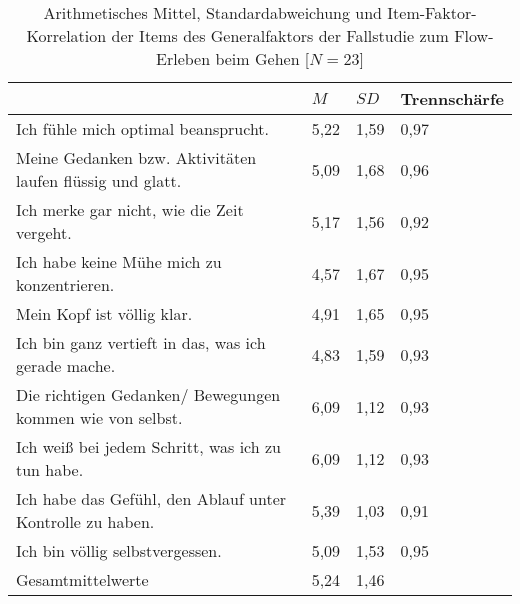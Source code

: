 \pagebreak

\begin{table}[ht]
\centering
	\caption[Item-Faktor-Korrelation der Items des Generalfaktors (Fallstudie: Gehen)]{Arithmetisches Mittel, Standardabweichung und Item-Faktor-Korrelation der Items des Generalfaktors der Fallstudie zum Flow-Erleben beim Gehen [$N = 23$]}
	\label{tab:generalfaktor_fallstudie_gehen}
	\begin{tabularx}{\textwidth}{p{} p{} p{} p{}}
\toprule
& $M$ & $SD$ & Trennschärfe \\
\midrule
Ich fühle mich optimal beansprucht. & 5,22 & 1,59 & 0,97 \\ 
  Meine Gedanken bzw. Aktivitäten laufen flüssig und glatt. & 5,09 & 1,68 & 0,96 \\ 
  Ich merke gar nicht, wie die Zeit vergeht. & 5,17 & 1,56 & 0,92 \\ 
  Ich habe keine Mühe mich zu konzentrieren. & 4,57 & 1,67 & 0,95 \\ 
  Mein Kopf ist völlig klar. & 4,91 & 1,65 & 0,95 \\ 
  Ich bin ganz vertieft in das, was ich gerade mache. & 4,83 & 1,59 & 0,93 \\ 
  Die richtigen Gedanken/ Bewegungen kommen wie von selbst. & 6,09 & 1,12 & 0,93 \\ 
  Ich weiß bei jedem Schritt, was ich zu tun habe. & 6,09 & 1,12 & 0,93 \\ 
  Ich habe das Gefühl, den Ablauf unter Kontrolle zu haben. & 5,39 & 1,03 & 0,91 \\ 
  Ich bin völlig selbstvergessen. & 5,09 & 1,53 & 0,95 \\ 
  Gesamtmittelwerte & 5,24 & 1,46 &  \\ 
\bottomrule
\end{tabularx}
\end{table}

\pagebreak

